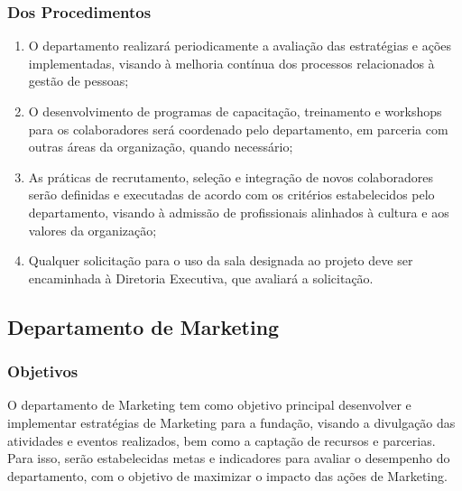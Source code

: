         \subsubsection{Dos Procedimentos}
            \begin{enumerate}
                \item O departamento realizará periodicamente a avaliação das estratégias e ações implementadas, visando à melhoria contínua dos processos relacionados à gestão de pessoas;
                \item O desenvolvimento de programas de capacitação, treinamento e workshops para os colaboradores será coordenado pelo departamento, em parceria com outras áreas da organização, quando necessário;
                \item As práticas de recrutamento, seleção e integração de novos colaboradores serão definidas e executadas de acordo com os critérios estabelecidos pelo departamento, visando à admissão de profissionais alinhados à cultura e aos valores da organização;
                \item Qualquer solicitação para o uso da sala designada ao projeto deve ser encaminhada à Diretoria Executiva, que avaliará a solicitação.
            \end{enumerate}
   \subsection{Departamento de Marketing}
        \subsubsection{Objetivos}
            O departamento de Marketing tem como objetivo principal desenvolver e implementar estratégias de Marketing para a fundação, visando a divulgação das atividades e eventos realizados, bem como a captação de recursos e parcerias. Para isso, serão estabelecidas metas e indicadores para avaliar o desempenho do departamento, com o objetivo de maximizar o impacto das ações de Marketing.
